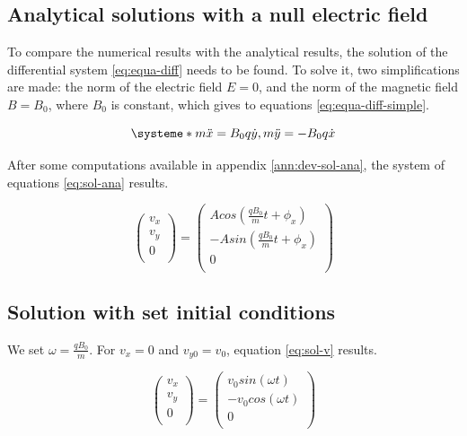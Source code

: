 \documentclass[a4paper,12pt,twoside]{article}
\begin{document}
\subsection{Analytical solutions with a null electric field}
To compare the numerical results with the analytical results, the solution of the differential system \ref{eq:equa-diff} needs to be found.
To solve it, two simplifications are made: the norm of the electric field $E=0$, and the norm of the magnetic field $B=B_0$, where $B_0$ is constant, which gives to equations \ref{eq:equa-diff-simple}.

\begin{equation}
\systeme*{m\ddot{x} = B_0q\dot{y}, m\ddot{y} = - B_0q\dot{x}}
\label{eq:equa-diff-simple}
\end{equation}

After some computations available in appendix \ref{ann:dev-sol-ana}, the system of equations \ref{eq:sol-ana} results.

\begin{equation}
	\begin{pmatrix} v_x\\ v_y\\ 0\\ \end{pmatrix} = \begin{pmatrix} Acos(\frac{qB_0}{m} t + \phi_x)\\ -Asin(\frac{qB_0}{m} t + \phi_x)\\ 0\\ \end{pmatrix}
\label{eq:sol-ana}
\end{equation}

\subsection{Solution with set initial conditions}

We set $\omega = \frac{qB_0}{m}$. For $v_x=0$ and $v_{y0} = v_0$, equation \ref{eq:sol-v} results.

\begin{equation}
	\begin{pmatrix} v_x\\ v_y\\ 0\\ \end{pmatrix} = \begin{pmatrix} v_0 sin(\omega t)\\ -v_0 cos(\omega t)\\ 0\\ \end{pmatrix}
\label{eq:sol-v}
\end{equation}
\end{document}
